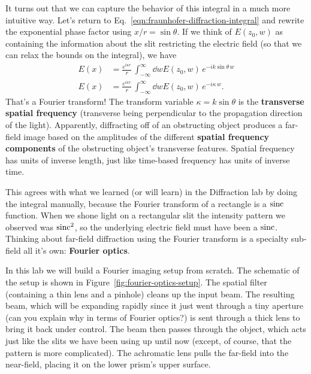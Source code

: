 \documentclass[]{manual}
\begin{document}
    It turns out that we can capture the behavior of this integral in a much more intuitive way.
    Let's return to Eq.~\eqref{eqn:fraunhofer-diffraction-integral} and rewrite the exponential phase factor using $x / r = \sin \theta$.
    If we think of $E(z_0, w)$ as containing the information about the slit restricting the electric field (so that we can relax the bounds on the integral), we have
    \begin{align}
        E(x) &= \frac{e^{i \kappa r}}{r} \, \int^{\infty}_{-\infty} \dd{w} E(z_0, w) \, e^{-i k \sin\theta \, w} \nonumber \\
        E(x) &= \frac{e^{i \kappa r}}{r} \, \int^{\infty}_{-\infty} \dd{w} E(z_0, w) \, e^{-i \kappa \, w}.
    \end{align}
    That's a Fourier transform!
    The transform variable $\kappa = k \sin{\theta}$ is the \textbf{transverse spatial frequency} (transverse being perpendicular to the propagation direction of the light).
    Apparently, diffracting off of an obstructing object produces a far-field image based on the amplitudes of the different \textbf{spatial frequency components} of the obstructing object's transverse features.
    Spatial frequency has units of inverse length, just like time-based frequency has units of inverse time.

    This agrees with what we learned (or will learn) in the Diffraction lab by doing the integral manually, because the Fourier transform of a rectangle is a $\operatorname{sinc}$ function.
    When we shone light on a rectangular slit the intensity pattern we observed was $\operatorname{sinc}^2$, so the underlying electric field must have been a $\operatorname{sinc}$.
    Thinking about far-field diffraction using the Fourier transform is a specialty sub-field all it's own: \textbf{Fourier optics}.

    In this lab we will build a Fourier imaging setup from scratch.
    The schematic of the setup is shown in Figure~\ref{fig:fourier-optics-setup}.
    The spatial filter (containing a thin lens and a pinhole) cleans up the input beam.
    The resulting beam, which will be expanding rapidly since it just went through a tiny aperture (can you explain why in terms of Fourier optics?) is sent through a thick lens to bring it back under control.
    The beam then passes through the object, which acts just like the slits we have been using up until now (except, of course, that the pattern is more complicated).
    The achromatic lens pulls the far-field into the near-field, placing it on the lower prism's upper surface.
\end{document}

